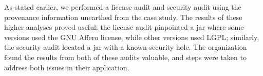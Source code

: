 As stated earlier, we performed a license audit and security audit using
the provenance information unearthed from the case study.  The results of
these higher analyses proved useful: the license audit pinpointed a jar
where some versions used the GNU Affero license, while other versions used
LGPL; similarly, the security audit located a jar with a known security
hole.  The organization found the results from both of these audits
valuable, and steps were taken to address both issues in their application.



